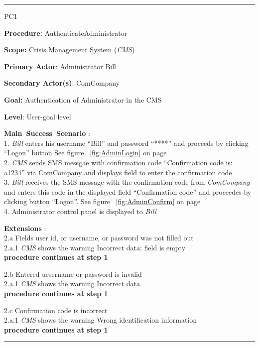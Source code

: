 \vspace{0.5cm}
\hrule
\begin{lyxlist}{PC1}
\small{
\item [\textbf{Procedure:}] AuthenticateAdministrator
\item [\textbf{Scope:}] Crisis Management System (\emph{CMS})
\item [\textbf{Primary Actor}:] Administrator Bill
\item [\textbf{Secondary Actor(s)}:] ComCompany
\item [\textbf{Goal:}] Authentication of Administrator in the CMS
\item [\textbf{Level}:] User-goal level
\item [\textbf{Main~Success~Scenario}]:\\
1. \emph{Bill} enters his username ``Bill'' and password ``****'' and proceeds by
clicking ``Logon'' button
See figure ~\ref{fig:AdminLogin} on page~\pageref{fig:AdminLogin}\\
2. \emph{CMS} sends SMS messgae with confirmation code ``Confirmation code is:
a1234'' via ComCompany and displays field to enter the confirmation code \\
3. \emph{Bill} receives the SMS message with the confirmation code from
\emph{ComCompany} and enters this code in the displayed field ``Confirmation
code'' and proceedes by clicking button ``Logon''. See figure ~\ref{fig:AdminConfirm}
on page ~\pageref{fig:AdminConfirm}\\
4. Administrator control panel is displayed to \emph{Bill} 

\item [\textbf{Extensions}]:\\
2.a Fields user id, or username, or password was not filled out\\
\hspace*{0.5cm} 2.a.1 \emph{CMS} shows the warning Incorrect data: field is
empty\\
\hspace*{0.5cm} \textbf{procedure continues at step 1}

2.b Entered uesername or password is invalid\\
\hspace*{0.5cm} 2.a.1 \emph{CMS} shows the warning Incorrect data\\
\hspace*{0.5cm} \textbf{procedure continues at step 1}

2.c Confirmation code is incorrect\\
\hspace*{0.5cm} 2.a.1 \emph{CMS} shows the warning Wrong identification information\\
\hspace*{0.5cm} \textbf{procedure continues at step 1}

}
\end{lyxlist}
\hrule
\vspace{0.5cm}


